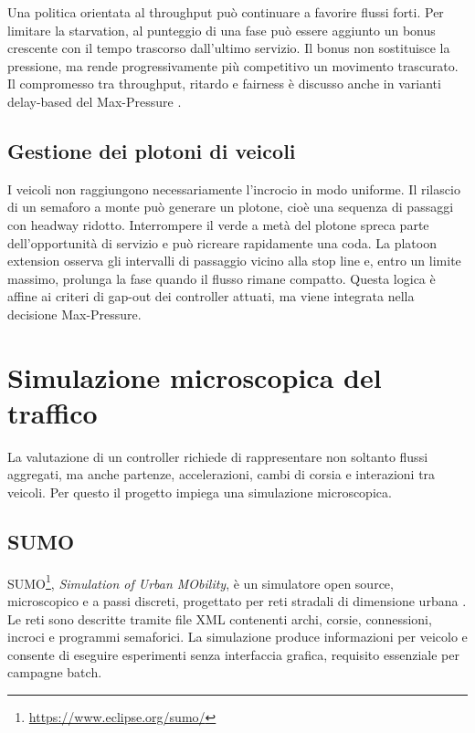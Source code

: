 \documentclass[12pt,a4paper,oneside]{report}
\numberwithin{equation}{chapter}
\begin{document}
Una politica orientata al throughput può continuare a favorire flussi forti.
Per limitare la starvation, al punteggio di una fase può essere aggiunto un
bonus crescente con il tempo trascorso dall'ultimo servizio. Il bonus non
sostituisce la pressione, ma rende progressivamente più competitivo un
movimento trascurato. Il compromesso tra throughput, ritardo e fairness è
discusso anche in varianti delay-based del Max-Pressure
\cite{wu2018fairness,liu2022delay}.

\subsection{Gestione dei plotoni di veicoli}

I veicoli non raggiungono necessariamente l'incrocio in modo uniforme. Il
rilascio di un semaforo a monte può generare un plotone, cioè una sequenza di
passaggi con headway ridotto. Interrompere il verde a metà del plotone spreca
parte dell'opportunità di servizio e può ricreare rapidamente una coda. La
platoon extension osserva gli intervalli di passaggio vicino alla stop line e,
entro un limite massimo, prolunga la fase quando il flusso rimane compatto.
Questa logica è affine ai criteri di gap-out dei controller attuati, ma viene
integrata nella decisione Max-Pressure.

\section{Simulazione microscopica del traffico}

La valutazione di un controller richiede di rappresentare non soltanto flussi
aggregati, ma anche partenze, accelerazioni, cambi di corsia e interazioni tra
veicoli. Per questo il progetto impiega una simulazione microscopica.

\subsection{SUMO}

SUMO\footnote{\url{https://www.eclipse.org/sumo/}}, \emph{Simulation of Urban MObility}, è un simulatore open source,
microscopico e a passi discreti, progettato per reti stradali di dimensione
urbana \cite{alvarezlopez2018sumo,sumodocs2026}. Le reti sono descritte tramite file
XML contenenti archi, corsie, connessioni, incroci e programmi semaforici. La
simulazione produce informazioni per veicolo e consente di eseguire esperimenti
senza interfaccia grafica, requisito essenziale per campagne batch.
\end{document}
